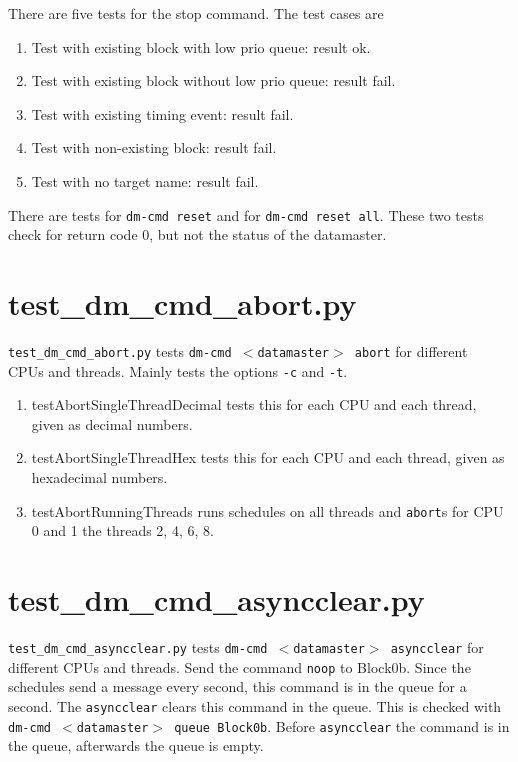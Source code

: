 \documentclass[12pt,a4paper]{report}
\begin{document}
There are five tests for the stop command. The test cases are
\begin{enumerate}
\item Test with existing block with low prio queue: result ok.
\item Test with existing block without low prio queue: result fail.
\item Test with existing timing event: result fail.
\item Test with non-existing block: result fail.
\item Test with no target name: result fail.
\end{enumerate}

There are tests for \texttt{dm-cmd reset} and for \texttt{dm-cmd reset all}. These two tests check for
return code 0, but not the status of the datamaster.

\section{test\_dm\_cmd\_abort.py}
\texttt{test\_dm\_cmd\_abort.py} tests \texttt{dm-cmd $<$datamaster$>$ abort} for different \\ CPUs and threads.
Mainly tests the options \texttt{-c} and \texttt{-t}.
\begin{enumerate}
\item testAbortSingleThreadDecimal tests this for each CPU and each thread, given as decimal numbers.
\item testAbortSingleThreadHex tests this for each CPU and each thread, given as hexadecimal numbers.
\item testAbortRunningThreads runs schedules on all threads and \texttt{abort}s for CPU 0 and 1 the threads 2, 4, 6, 8.
\end{enumerate}

\section{test\_dm\_cmd\_asyncclear.py}
\texttt{test\_dm\_cmd\_asyncclear.py} tests \texttt{dm-cmd $<$datamaster$>$ asyncclear} for different CPUs and threads.
Send the command \texttt{noop} to Block0b. Since the schedules send a message every second, this command is in the queue
for a second. The \texttt{asyncclear} clears this command in the queue. This is
checked with \texttt{dm-cmd $<$datamaster$>$ queue Block0b}. Before
\texttt{asyncclear} the command is in the queue, afterwards the queue is empty.
\end{document}
